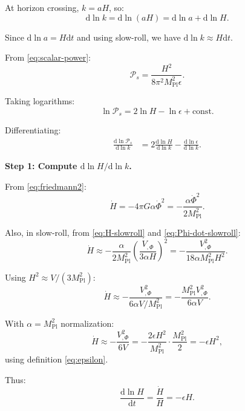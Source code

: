 \documentclass[11pt,a4paper]{article}
\numberwithin{equation}{section}
\theoremstyle{plain}
\theoremstyle{definition}
\theoremstyle{remark}
\newcommand{\dd}{\mathrm{d}}
\begin{document}
At horizon crossing, $k = aH$, so:
\begin{equation}
\dd\ln k = \dd\ln(aH) = \dd\ln a + \dd\ln H.
\end{equation}

Since $\dd\ln a = H\dd t$ and using slow-roll, we have $\dd\ln k \approx H\dd t$.

From \eqref{eq:scalar-power}:
\begin{equation}
\mathcal{P}_s = \frac{H^2}{8\pi^2 M_{\mathrm{Pl}}^2\epsilon}.
\end{equation}

Taking logarithms:
\begin{equation}
\ln\mathcal{P}_s = 2\ln H - \ln\epsilon + \text{const}.
\end{equation}

Differentiating:
\begin{align}
\frac{\dd\ln\mathcal{P}_s}{\dd\ln k} &= 2\frac{\dd\ln H}{\dd\ln k} - \frac{\dd\ln\epsilon}{\dd\ln k}.
\label{eq:ns-step1}
\end{align}

\textbf{Step 1: Compute $\dd\ln H/\dd\ln k$.}

From \eqref{eq:friedmann2}:
\begin{equation}
\dot{H} = -4\pi G\alpha\dot{\Phi}^2 = -\frac{\alpha\dot{\Phi}^2}{2M_{\mathrm{Pl}}^2}.
\end{equation}

Also, in slow-roll, from \eqref{eq:H-slowroll} and \eqref{eq:Phi-dot-slowroll}:
\begin{equation}
\dot{H} \approx -\frac{\alpha}{2M_{\mathrm{Pl}}^2}\left(\frac{V_{,\Phi}}{3\alpha H}\right)^2 = -\frac{V_{,\Phi}^2}{18\alpha M_{\mathrm{Pl}}^2 H^2}.
\end{equation}

Using $H^2 \approx V/(3M_{\mathrm{Pl}}^2)$:
\begin{equation}
\dot{H} \approx -\frac{V_{,\Phi}^2}{6\alpha V/M_{\mathrm{Pl}}^2} = -\frac{M_{\mathrm{Pl}}^2 V_{,\Phi}^2}{6\alpha V}.
\end{equation}

With $\alpha = M_{\mathrm{Pl}}^2$ normalization:
\begin{equation}
\dot{H} \approx -\frac{V_{,\Phi}^2}{6V} = -\frac{2\epsilon H^2}{M_{\mathrm{Pl}}^2}\cdot\frac{M_{\mathrm{Pl}}^2}{2} = -\epsilon H^2,
\end{equation}
using definition \eqref{eq:epsilon}.

Thus:
\begin{equation}
\frac{\dd\ln H}{\dd t} = \frac{\dot{H}}{H} = -\epsilon H.
\end{equation}
\end{document}
